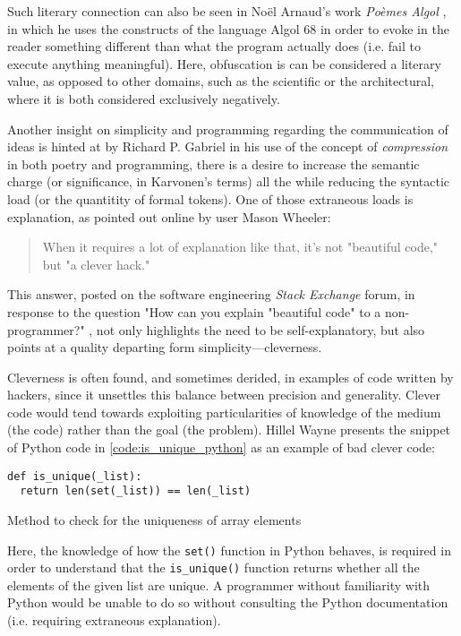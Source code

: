Such literary connection can also be seen in Noël Arnaud's work \emph{Poèmes Algol} \citep{arnaud_poemes_1968}, in which he uses the constructs of the language Algol 68 in order to evoke in the reader something different than what the program actually does (i.e. fail to execute anything meaningful). Here, obfuscation is can be considered a literary value, as opposed to other domains, such as the scientific or the architectural, where it is both considered exclusively negatively.

Another insight on simplicity and programming regarding the communication of ideas is hinted at by Richard P. Gabriel in his use of the concept of \emph{compression} in both poetry and programming, there is a desire to increase the semantic charge (or significance, in Karvonen's terms) all the while reducing the syntactic load (or the quantitity of formal tokens). One of those extraneous loads is explanation, as pointed out online by user Mason Wheeler:

\begin{quote}
  When it requires a lot of explanation like that, it's not "beautiful code," but "a clever hack." \citep{how_2013a}
\end{quote}

This answer, posted on the software engineering \emph{Stack Exchange} forum, in response to the question "How can you explain "beautiful code" to a non-programmer?" \citep{how_2013a}, not only highlights the need to be self-explanatory, but also points at a quality departing form simplicity—cleverness.

Cleverness is often found, and sometimes derided, in examples of code written by hackers, since it unsettles this balance between precision and generality. Clever code would tend towards exploiting particularities of knowledge of the medium (the code) rather than the goal (the problem). Hillel Wayne presents the snippet of Python code in \ref{code:is_unique_python} as an example of bad clever code:

\begin{listing}
  \begin{verbatim}
def is_unique(_list):
  return len(set(_list)) == len(_list)
\end{verbatim}
  \caption{Method to check for the uniqueness of array elements}
  \label{code:is_unique_python}
\end{listing}

Here, the knowledge of how the \lstinline{set()} function in Python behaves, is required in order to understand that the \lstinline{is_unique()} function returns whether all the elements of the given list are unique. A programmer without familiarity with Python would be unable to do so without consulting the Python documentation (i.e. requiring extraneous explanation).

